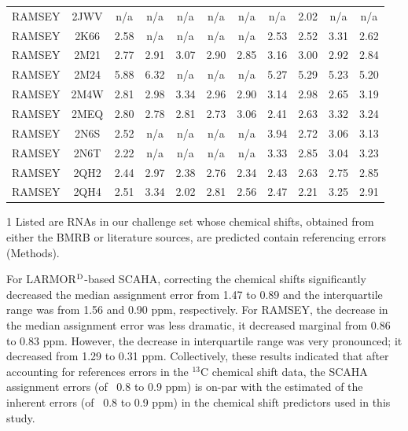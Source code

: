 \documentclass[journal=jcisd8,manuscript=article,layout=onecolumn]{achemso}
\begin{document}
\begin{table}[h!]
\begin{threeparttable}
\begin{tabular}{c c c c c c c c c c c}
RAMSEY  & 2JWV & n/a & n/a & n/a & n/a & n/a & n/a & 2.02 & n/a & n/a \\
RAMSEY  & 2K66 & 2.58 & n/a & n/a & n/a & n/a & 2.53 & 2.52 & 3.31 & 2.62 \\
RAMSEY  & 2M21 & 2.77 & 2.91 & 3.07 & 2.90 & 2.85 & 3.16 & 3.00 & 2.92 & 2.84 \\
RAMSEY  & 2M24 & 5.88 & 6.32 & n/a & n/a & n/a & 5.27 & 5.29 & 5.23 & 5.20 \\
RAMSEY  & 2M4W & 2.81 & 2.98 & 3.34 & 2.96 & 2.90 & 3.14 & 2.98 & 2.65 & 3.19 \\
RAMSEY  & 2MEQ & 2.80 & 2.78 & 2.81 & 2.73 & 3.06 & 2.41 & 2.63 & 3.32 & 3.24 \\
RAMSEY  & 2N6S & 2.52 & n/a & n/a & n/a & n/a & 3.94 & 2.72 & 3.06 & 3.13 \\
RAMSEY  & 2N6T & 2.22 & n/a & n/a & n/a & n/a & 3.33 & 2.85 & 3.04 & 3.23 \\
RAMSEY  & 2QH2 & 2.44 & 2.97 & 2.38 & 2.76 & 2.34 & 2.43 & 2.63 & 2.75 & 2.85 \\
RAMSEY  & 2QH4 & 2.51 & 3.34 & 2.02 & 2.81 & 2.56 & 2.47 & 2.21 & 3.25 & 2.91 \\

\hline
\end{tabular}
\begin{tablenotes}
\item[1] Listed are RNAs in our challenge set whose chemical shifts, obtained from either the BMRB or literature sources, are predicted contain referencing errors (Methods).
\end{tablenotes}
\end{threeparttable}
\label{tab:referrors} 
\end{table}

For LARMOR$^{\rm D}$-based SCAHA, correcting the chemical shifts significantly decreased the median assignment error from 1.47 to 0.89 and  the interquartile range was from 1.56 and 0.90 ppm, respectively. For RAMSEY, the decrease in the median assignment error was less dramatic, it decreased marginal from 0.86 to 0.83 ppm. However, the decrease in interquartile range was very pronounced; it decreased from 1.29 to 0.31 ppm. Collectively, these results indicated that after accounting for references  errors in the $^{13}$C chemical shift data, the SCAHA assignment errors (of ~0.8 to 0.9 ppm) is on-par with the estimated of the inherent errors (of ~0.8 to 0.9 ppm) in the chemical shift predictors  used in this study.  
\end{document}
